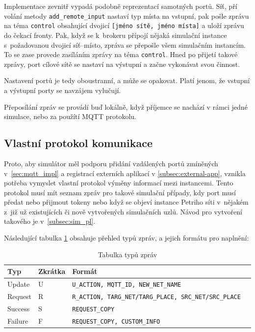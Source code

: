 Implementace zevnitř vypadá podobně reprezentací samotných portů. Síť, pří volání metody \texttt{add\_remote\_input} nastaví typ místa na vstupní, pak pošle zprávu na téma \texttt{control} obsahující dvojicí \texttt{[jméno sítě, jméno místa]} a uloží zprávu do čekací fronty. Pak, když se k~brokeru přípojí nějaká simulační instance s~požadovanou dvojicí síť--místo, zpráva se přepošle všem simulačním instancím. To se zase provede zasíláním zprávy na téma \texttt{control}. Hned po přijetí takové zprávy, port cílové sítě se nastaví na výstupní a začne vykonávat svou činnost.

Nastavení portů je tedy oboustranní, a může se opakovat. Platí jenom, že vstupní a výstupní porty se navzájem vylučují.

Přeposílání zpráv se provádí buď lokálně, když příjemce se nachází v rámci jedné simulace, nebo za použítí MQTT protokolu.

\subsection{Vlastní protokol komunikace}
\label{subsec:comm-proto}

Proto, aby simulátor měl podporu přidání vzdálených portů zmíněných v~\ref{sec:mqtt_impl} a registrací externích aplikací v \ref{subsec:external-app}, vznikla potřeba vymyslet vlastní protokol výměny informací mezi instancemi. Tento protokol musí mít seznam zpráv pro takové simulační případy, kdy port musí předat nebo přijmout tokeny nebo když se objeví instance Petriho síti v~nějakém z~již už existujících či nově vytvořených simulačních uzlů. Návod pro vytvoření takového je v~\ref{subsec:sim_pl}.

Následující tabulka \ref{tab:mqtt-msg-types} obsahuje přehled typů zpráv, a jejich formátu pro naplnění:

\begin{table}[H]
  \vskip6pt
  \caption{Tabulka typů zpráv}
  \vskip6pt
  \centering
  \begin{tabular}{lllr}
    \toprule
    Typ & Zkrátka & Formát \\
    \midrule
    Update & U~& \texttt{U\_ACTION, MQTT\_ID, NEW\_NET\_NAME} \\
    Request & R & \texttt{R\_ACTION, TARG\_NET/TARG\_PLACE, SRC\_NET/SRC\_PLACE} \\
    Success & S~& \texttt{REQUEST\_COPY} \\
    Failure & F & \texttt{REQUEST\_COPY, CUSTOM\_INFO} \\
    \bottomrule
  \end{tabular}
  \label{tab:mqtt-msg-types}
\end{table}

